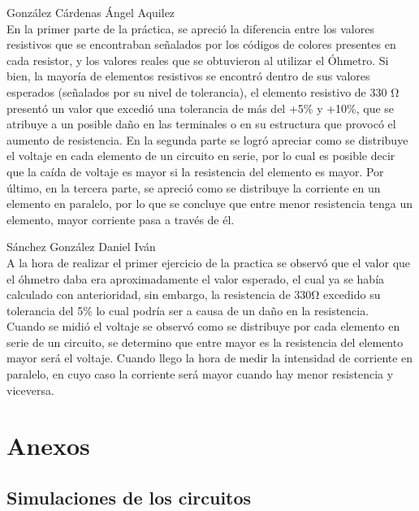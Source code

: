 \documentclass[a4paper,12pt]{article}
\begin{document}
{\Large González Cárdenas Ángel Aquilez}\\
\vspace{.3cm}
En la primer parte de la práctica, se apreció la diferencia entre los valores resistivos que se encontraban señalados por los códigos de colores presentes en cada resistor, y los valores reales que se obtuvieron al utilizar el Óhmetro. Si bien, la mayoría de elementos resistivos se encontró dentro de sus valores esperados (señalados por su nivel de tolerancia), el elemento resistivo de 330 \si{\ohm} presentó un valor que excedió una tolerancia de más del +5\% y +10\%, que se atribuye a un posible daño en las terminales o en su estructura que provocó el aumento de resistencia. En la segunda parte se logró apreciar como se distribuye el voltaje en cada elemento de un circuito en serie, por lo cual es posible decir que la caída de voltaje es mayor si la resistencia del elemento es mayor. Por último, en la tercera parte, se apreció como se distribuye la corriente en un elemento en paralelo, por lo que se concluye que entre menor resistencia tenga un elemento, mayor corriente pasa a través de él.\\

\vspace{.5cm}

{\Large Sánchez González Daniel Iván}\\
\vspace{.3cm}
A la hora de realizar el primer ejercicio de la practica se observó que el valor que el óhmetro daba era aproximadamente el valor esperado, el cual ya se había calculado con anterioridad, sin embargo, la resistencia de 330\si{\ohm} excedido su tolerancia del 5\% lo cual podría ser a causa de un daño en la resistencia.\\
Cuando se midió el voltaje se observó como se distribuye por cada elemento en serie de un circuito, se determino que entre mayor es la resistencia del elemento mayor será el voltaje. Cuando llego la hora de medir la intensidad de corriente en paralelo, en cuyo caso la corriente será mayor cuando hay menor resistencia y viceversa.\\

\section{Anexos}
\subsection{Simulaciones de los circuitos}
\end{document}
